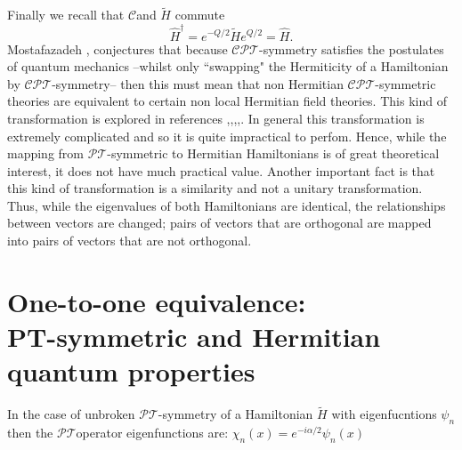 \documentclass[12pt, a4paper]{report}
\newcommand\PT{\(\mathcal{PT}\)}
\newcommand\CPT{\(\mathcal{CPT}\)}
\newcommand\CC{\(\mathcal{C}\)}
\begin{document}
Finally we recall that \CC\:and $\tilde{H}$ commute
\begin{equation}\label{eq:2.6}
\hat{H}^{\dagger} = e^{-Q/2}\tilde{H}e^{Q/2} = \hat{H}.
\end{equation}
Mostafazadeh \cite{Mostafazadeh}, conjectures that because \CPT-symmetry satisfies the postulates of quantum mechanics --whilst only ``swapping" the Hermiticity of a Hamiltonian by \CPT-symmetry-- then this must mean that non Hermitian \CPT-symmetric theories are equivalent to certain non local Hermitian field theories. This kind of transformation is explored in references \cite{Mostafazadeh},\cite{EquivalentHH},\cite{Pseudo-HermiticityIII},\cite{Jones_2005},\cite{taleof2potentials}.
In general this transformation is extremely complicated and so it is quite impractical to perfom. Hence, while the mapping from \PT-symmetric to Hermitian Hamiltonians is of great theoretical interest, it does not have much practical value\cite{MakingSense}. Another important fact is that this kind of transformation is a similarity and not a unitary transformation. Thus, while the eigenvalues of both Hamiltonians are identical, the relationships between
vectors are changed; pairs of vectors that are orthogonal are mapped into pairs of vectors that are not orthogonal\cite{MakingSense}\cite{Bender_2007}.

\section*{One-to-one equivalence:\\ PT-symmetric and Hermitian quantum properties}\label{}

In the case of unbroken \PT-symmetry of a Hamiltonian $\tilde{H}$ with eigenfucntions $\psi_n$ then the \PT\:operator eigenfunctions are: $\chi_{n}(x) = e^{-i\alpha/2}\psi_n(x)$\\
\end{document}
